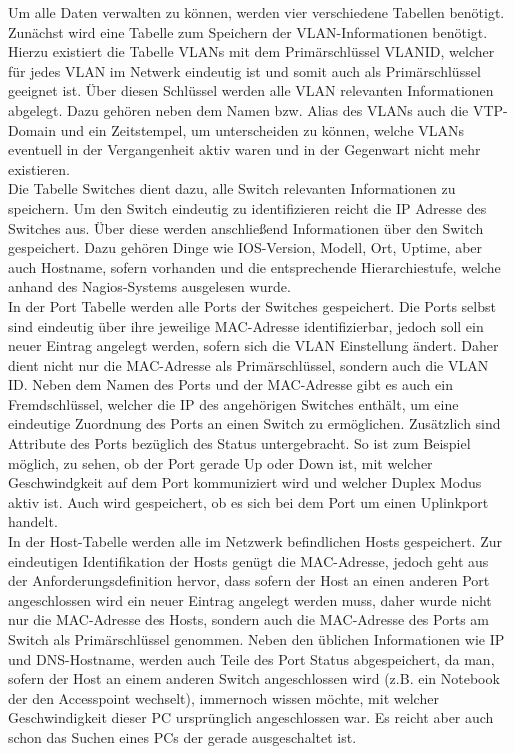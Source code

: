 Um alle Daten verwalten zu können, werden vier verschiedene Tabellen benötigt.\\
Zunächst wird eine Tabelle zum Speichern der VLAN-Informationen benötigt.
Hierzu existiert die Tabelle VLANs mit dem Primärschlüssel VLANID, welcher für jedes VLAN im Netwerk eindeutig ist und somit auch als Primärschlüssel geeignet ist. Über diesen Schlüssel werden alle VLAN relevanten Informationen abgelegt. Dazu gehören neben dem Namen bzw. Alias des VLANs auch die VTP-Domain und ein Zeitstempel, um unterscheiden zu können, welche VLANs eventuell in der Vergangenheit aktiv waren und in der Gegenwart nicht mehr existieren.\\
Die Tabelle Switches dient dazu, alle Switch relevanten Informationen zu speichern. 
Um den Switch eindeutig zu identifizieren reicht die IP Adresse des Switches aus. Über diese werden anschließend Informationen über den Switch gespeichert. Dazu gehören Dinge wie IOS-Version, Modell, Ort, Uptime, aber auch Hostname, sofern vorhanden und die entsprechende Hierarchiestufe, welche anhand des Nagios-Systems ausgelesen wurde.\\
In der Port Tabelle werden alle Ports der Switches gespeichert. Die Ports selbst sind eindeutig über ihre jeweilige MAC-Adresse identifizierbar, jedoch soll ein neuer Eintrag angelegt werden, sofern sich die VLAN Einstellung ändert.
Daher dient nicht nur die MAC-Adresse als Primärschlüssel, sondern auch die VLAN ID.
Neben dem Namen des Ports und der MAC-Adresse gibt es auch ein Fremdschlüssel, welcher die IP des angehörigen Switches enthält, um eine eindeutige Zuordnung des Ports an einen Switch zu ermöglichen.
Zusätzlich sind Attribute des Ports bezüglich des Status untergebracht.
So ist zum Beispiel möglich, zu sehen, ob der Port gerade Up oder Down ist, mit welcher Geschwindgkeit auf dem Port kommuniziert wird und welcher Duplex Modus aktiv ist. Auch wird gespeichert, ob es sich bei dem Port um einen Uplinkport handelt.\\
In der Host-Tabelle werden alle im Netzwerk befindlichen Hosts gespeichert.
Zur eindeutigen Identifikation der Hosts genügt die MAC-Adresse, jedoch geht aus der Anforderungsdefinition hervor, dass sofern der Host an einen anderen Port angeschlossen wird ein neuer Eintrag angelegt werden muss, daher wurde nicht nur die MAC-Adresse des Hosts, sondern auch die MAC-Adresse des Ports am Switch als Primärschlüssel genommen. Neben den üblichen Informationen wie IP und DNS-Hostname, werden auch Teile des Port Status abgespeichert, da man, sofern der Host an einem anderen Switch angeschlossen wird (z.B. ein Notebook der den Accesspoint wechselt), immernoch wissen möchte, mit welcher Geschwindigkeit dieser PC ursprünglich angeschlossen war. Es reicht aber auch schon das Suchen eines PCs der gerade ausgeschaltet ist.
